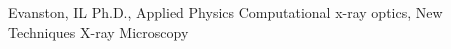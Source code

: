 
        {Evanston, IL}
		{\newline Ph.D., Applied Physics}
		{\newline Computational x-ray optics, New Techniques X-ray Microscopy}
		{}
